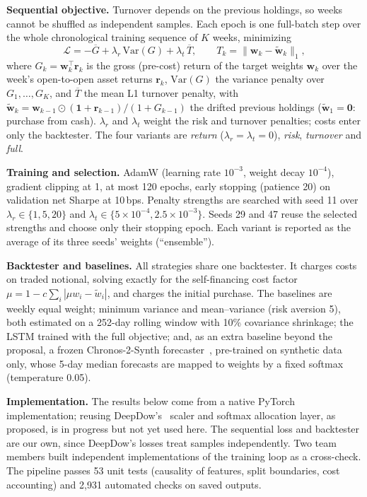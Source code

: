 \documentclass[10pt,twocolumn,letterpaper]{article}
\begin{document}
\textbf{Sequential objective.} Turnover depends on the previous holdings, so weeks cannot be
shuffled as independent samples. Each epoch is one full-batch step over the whole chronological
training sequence of $K$ weeks, minimizing
\begin{equation}
  \mathcal{L} = -\overline{G} + \lambda_r\,\mathrm{Var}(G) + \lambda_t\,\overline{T},
  \qquad T_k = \lVert \mathbf{w}_k - \tilde{\mathbf{w}}_{k} \rVert_1 ,
\end{equation}
where $G_k=\mathbf{w}_k^{\top}\mathbf{r}_k$ is the gross (pre-cost) return of the target
weights $\mathbf{w}_k$ over the week's open-to-open asset returns $\mathbf{r}_k$,
$\mathrm{Var}(G)$ the variance penalty over $G_1,\dots,G_K$, and $\overline{T}$ the mean L1
turnover penalty, with
$\tilde{\mathbf{w}}_k = \mathbf{w}_{k-1}\odot(\mathbf{1}+\mathbf{r}_{k-1})/(1+G_{k-1})$ the
drifted previous holdings ($\tilde{\mathbf{w}}_1=\mathbf{0}$: purchase from cash). $\lambda_r$
and $\lambda_t$ weight the risk and turnover penalties; costs enter only the backtester. The
four variants are \emph{return} ($\lambda_r{=}\lambda_t{=}0$), \emph{risk}, \emph{turnover}
and \emph{full}.

\textbf{Training and selection.} AdamW (learning rate $10^{-3}$, weight decay $10^{-4}$),
gradient clipping at 1, at most 120 epochs, early stopping (patience 20) on validation net
Sharpe at 10\,bps. Penalty strengths are searched with seed 11 over
$\lambda_r\in\{1,5,20\}$ and $\lambda_t\in\{5{\times}10^{-4},2.5{\times}10^{-3}\}$. Seeds 29 and
47 reuse the selected strengths and choose only their stopping epoch. Each variant is reported
as the average of its three seeds' weights (``ensemble'').

\textbf{Backtester and baselines.} All strategies share one backtester. It charges costs on
traded notional, solving exactly for the self-financing cost factor
$\mu = 1 - c\sum_i|\mu w_i - \tilde w_i|$, and charges the initial purchase. The baselines are
weekly equal weight; minimum variance and mean--variance (risk aversion 5), both estimated on a
252-day rolling window with 10\% covariance shrinkage; the LSTM trained with the full
objective; and, as an extra baseline beyond the proposal, a frozen Chronos-2-Synth
forecaster~\cite{ansari2025chronos2}, pre-trained on
synthetic data only, whose 5-day median forecasts are mapped to weights by a fixed softmax
(temperature 0.05).

\textbf{Implementation.} The results below come from a native PyTorch~\cite{pytorch}
implementation; reusing DeepDow's~\cite{deepdow} scaler and softmax allocation layer, as
proposed, is in progress but not yet used here. The sequential loss and backtester are our own,
since DeepDow's losses treat samples independently. Two team members built independent
implementations of the training loop as a cross-check. The pipeline passes 53 unit tests
(causality of features, split boundaries, cost accounting) and 2,931 automated checks
on saved outputs.
\end{document}
